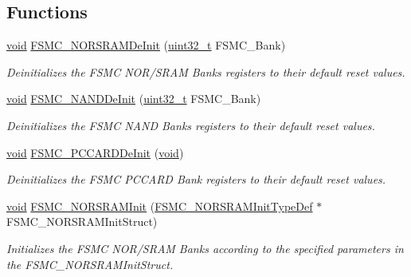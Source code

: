 \subsection*{Functions}
\begin{DoxyCompactItemize}
\item 
\hyperlink{usb__devapi_8h_afabf60e7f57651d6d595a02c75f07cd0}{void} \hyperlink{group___f_s_m_c___exported___functions_gaab3e6648e8a584e73785361ac960eded}{F\+S\+M\+C\+\_\+\+N\+O\+R\+S\+R\+A\+M\+De\+Init} (\hyperlink{_p_e___types_8h_a33594304e786b158f3fb30289278f5af}{uint32\+\_\+t} F\+S\+M\+C\+\_\+\+Bank)
\begin{DoxyCompactList}\small\item\em Deinitializes the F\+S\+MC N\+O\+R/\+S\+R\+AM Banks registers to their default reset values. \end{DoxyCompactList}\item 
\hyperlink{usb__devapi_8h_afabf60e7f57651d6d595a02c75f07cd0}{void} \hyperlink{group___f_s_m_c___exported___functions_gafb749503293474a68555961bd8f120e1}{F\+S\+M\+C\+\_\+\+N\+A\+N\+D\+De\+Init} (\hyperlink{_p_e___types_8h_a33594304e786b158f3fb30289278f5af}{uint32\+\_\+t} F\+S\+M\+C\+\_\+\+Bank)
\begin{DoxyCompactList}\small\item\em Deinitializes the F\+S\+MC N\+A\+ND Banks registers to their default reset values. \end{DoxyCompactList}\item 
\hyperlink{usb__devapi_8h_afabf60e7f57651d6d595a02c75f07cd0}{void} \hyperlink{group___f_s_m_c___exported___functions_ga2f53ccf3a4f3c80a5a56fb47ccd47ccd}{F\+S\+M\+C\+\_\+\+P\+C\+C\+A\+R\+D\+De\+Init} (\hyperlink{usb__devapi_8h_afabf60e7f57651d6d595a02c75f07cd0}{void})
\begin{DoxyCompactList}\small\item\em Deinitializes the F\+S\+MC P\+C\+C\+A\+RD Bank registers to their default reset values. \end{DoxyCompactList}\item 
\hyperlink{usb__devapi_8h_afabf60e7f57651d6d595a02c75f07cd0}{void} \hyperlink{group___f_s_m_c___exported___functions_ga9c27816e8b17394c9ee1ce9298917b4a}{F\+S\+M\+C\+\_\+\+N\+O\+R\+S\+R\+A\+M\+Init} (\hyperlink{struct_f_s_m_c___n_o_r_s_r_a_m_init_type_def}{F\+S\+M\+C\+\_\+\+N\+O\+R\+S\+R\+A\+M\+Init\+Type\+Def} $\ast$F\+S\+M\+C\+\_\+\+N\+O\+R\+S\+R\+A\+M\+Init\+Struct)
\begin{DoxyCompactList}\small\item\em Initializes the F\+S\+MC N\+O\+R/\+S\+R\+AM Banks according to the specified parameters in the F\+S\+M\+C\+\_\+\+N\+O\+R\+S\+R\+A\+M\+Init\+Struct. \end{DoxyCompactList}\item 

\end{DoxyCompactItemize}
